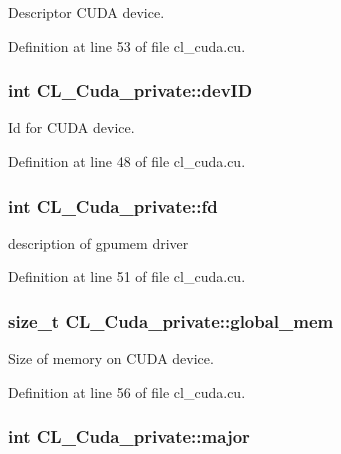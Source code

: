 Descriptor CUDA device. 

Definition at line 53 of file cl\_\-cuda.cu.\hypertarget{classCL__Cuda__private_ac48da65acdaf7d7400a98a6d2f893f1e}{
\subsubsection[{devID}]{\setlength{\rightskip}{0pt plus 5cm}int {\bf CL\_\-Cuda\_\-private::devID}}}
\label{classCL__Cuda__private_ac48da65acdaf7d7400a98a6d2f893f1e}


Id for CUDA device. 

Definition at line 48 of file cl\_\-cuda.cu.\hypertarget{classCL__Cuda__private_a35f342c3bcf3de609aa03c2d1c8665a4}{
\subsubsection[{fd}]{\setlength{\rightskip}{0pt plus 5cm}int {\bf CL\_\-Cuda\_\-private::fd}}}
\label{classCL__Cuda__private_a35f342c3bcf3de609aa03c2d1c8665a4}


description of gpumem driver 

Definition at line 51 of file cl\_\-cuda.cu.\hypertarget{classCL__Cuda__private_a66237a60653b0a5c1fe4fd21bb688da2}{
\subsubsection[{global\_\-mem}]{\setlength{\rightskip}{0pt plus 5cm}size\_\-t {\bf CL\_\-Cuda\_\-private::global\_\-mem}}}
\label{classCL__Cuda__private_a66237a60653b0a5c1fe4fd21bb688da2}


Size of memory on CUDA device. 

Definition at line 56 of file cl\_\-cuda.cu.\hypertarget{classCL__Cuda__private_a9cc50a203aee2dec568464e102f4cb54}{
\subsubsection[{major}]{\setlength{\rightskip}{0pt plus 5cm}int {\bf CL\_\-Cuda\_\-private::major}}}
\label{classCL__Cuda__private_a9cc50a203aee2dec568464e102f4cb54}


